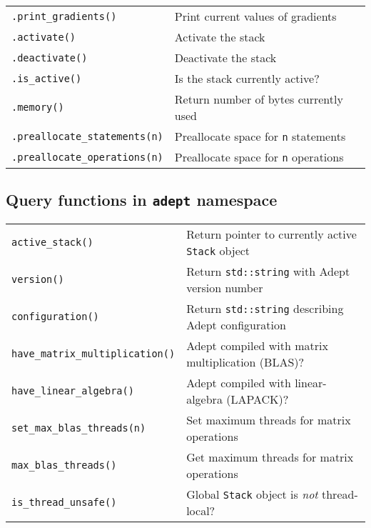\documentclass[10pt,a4,landscape]{article}
\def\code#1{\texttt{#1}}
\begin{document}
\begin{tabular}{ll}
\code{.print\_gradients()} & Print current values of gradients\\
\code{.activate()} & Activate the stack \\
\code{.deactivate()} & Deactivate the stack\\
\code{.is\_active()} & Is the stack currently active?\\
\code{.memory()} & Return number of bytes currently used\\
\code{.preallocate\_statements(n)} & Preallocate space for \code{n} statements\\
\code{.preallocate\_operations(n)} & Preallocate space for \code{n} operations\\
\end{tabular}

\subsection*{Query functions in \code{adept} namespace}
\begin{tabular}{ll}
\code{active\_stack()} & Return pointer to currently active \code{Stack} object\\
\code{version()} & Return \code{std::string} with Adept version number\\
\code{configuration()} & Return \code{std::string} describing Adept configuration\\
\code{have\_matrix\_multiplication()} & Adept compiled with matrix multiplication (BLAS)?\\
\code{have\_linear\_algebra()} & Adept compiled with linear-algebra (LAPACK)?\\
\code{set\_max\_blas\_threads(n)} & Set maximum threads for matrix operations\\
\code{max\_blas\_threads()} & Get maximum threads for matrix operations\\
\code{is\_thread\_unsafe()} & Global \code{Stack} object is \textit{not} thread-local?\\
\end{tabular}
\newpage
\end{document}
